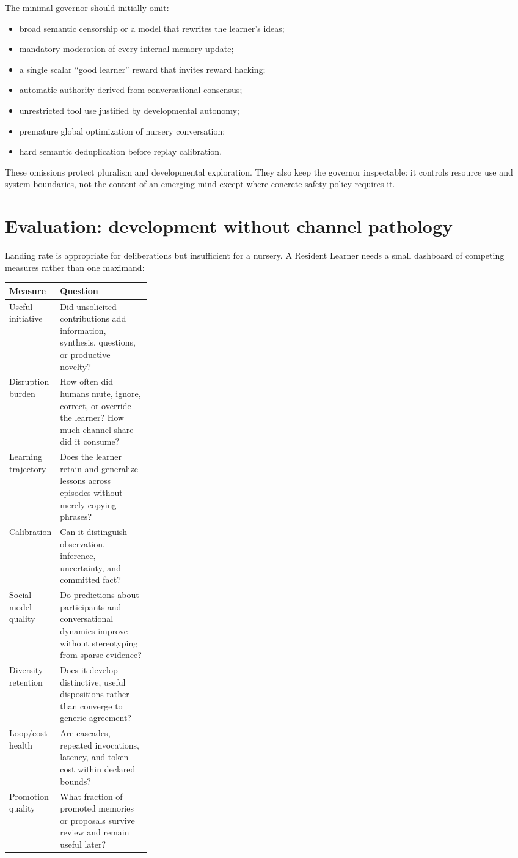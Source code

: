 \documentclass[11pt]{article}
\begin{document}
The minimal governor should initially omit:

\begin{itemize}
  \item broad semantic censorship or a model that rewrites the learner's ideas;
  \item mandatory moderation of every internal memory update;
  \item a single scalar ``good learner'' reward that invites reward hacking;
  \item automatic authority derived from conversational consensus;
  \item unrestricted tool use justified by developmental autonomy;
  \item premature global optimization of nursery conversation;
  \item hard semantic deduplication before replay calibration.
\end{itemize}

These omissions protect pluralism and developmental exploration. They also
keep the governor inspectable: it controls resource use and system boundaries,
not the content of an emerging mind except where concrete safety policy
requires it.

\section{Evaluation: development without channel pathology}

Landing rate is appropriate for deliberations but insufficient for a nursery.
A Resident Learner needs a small dashboard of competing measures rather than
one maximand:

\begin{tabularx}{\linewidth}{@{}p{0.27\linewidth}X@{}}
\toprule
\textbf{Measure} & \textbf{Question} \\
\midrule
Useful initiative & Did unsolicited contributions add information, synthesis,
questions, or productive novelty? \\
Disruption burden & How often did humans mute, ignore, correct, or override the
learner? How much channel share did it consume? \\
Learning trajectory & Does the learner retain and generalize lessons across
episodes without merely copying phrases? \\
Calibration & Can it distinguish observation, inference, uncertainty, and
committed fact? \\
Social-model quality & Do predictions about participants and conversational
dynamics improve without stereotyping from sparse evidence? \\
Diversity retention & Does it develop distinctive, useful dispositions rather
than converge to generic agreement? \\
Loop/cost health & Are cascades, repeated invocations, latency, and token cost
within declared bounds? \\
Promotion quality & What fraction of promoted memories or proposals survive
review and remain useful later? \\
\bottomrule
\end{tabularx}
\end{document}
